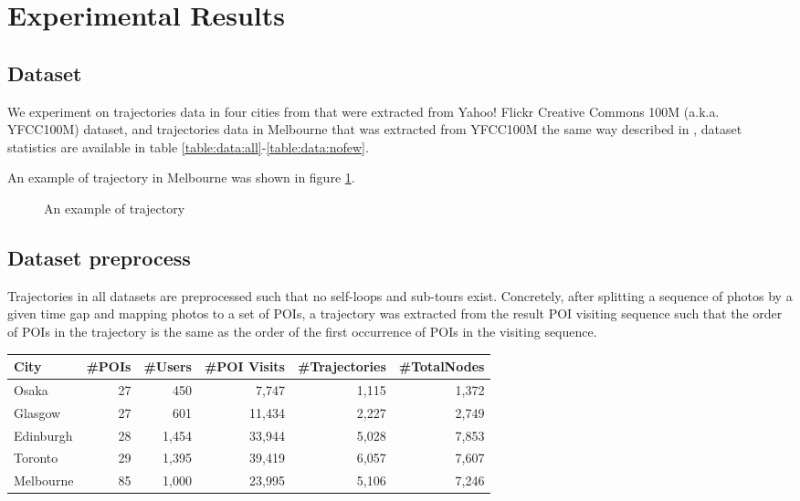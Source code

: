 \section{Experimental Results}
\label{experiment}

\subsection{Dataset}
\label{experiment:dataset}
We experiment on trajectories data in four cities from \cite{ijcai15} that were
extracted from Yahoo! Flickr Creative Commons 100M (a.k.a. YFCC100M) dataset\cite{yfcc100m},
and trajectories data in Melbourne that was extracted from YFCC100M the same way described in \cite{ht10, ijcai15},
dataset statistics are available in table \ref{table:data:all}-\ref{table:data:nofew}.

An example of trajectory in Melbourne was shown in figure \ref{fig:traj}.

\begin{figure}
\centering
{}
\caption{An example of trajectory}
\label{fig:traj}
\end{figure}

\subsection{Dataset preprocess}
\label{experiment:datapreprocess}
Trajectories in all datasets are preprocessed such that no self-loops and sub-tours exist.
Concretely, after splitting a sequence of photos by a given time gap and mapping photos to a set of POIs\cite{ht10, ijcai15},
a trajectory was extracted from the result POI visiting sequence such that the order of POIs in the trajectory is the same as 
the order of the first occurrence of POIs in the visiting sequence.

\begin{table*}
\centering
\caption{Dataset of all trajectories without loops}
\label{table:data:all}
\begin{tabular}{lrrrrr} \hline
\textbf{City} & \textbf{\#POIs} & \textbf{\#Users} & \textbf{\#POI Visits} & \textbf{\#Trajectories} & \textbf{\#TotalNodes} \\ \hline
Osaka & 27 & 450 & 7,747 & 1,115 & 1,372 \\ 
Glasgow & 27 & 601 & 11,434 & 2,227 & 2,749 \\ 
Edinburgh & 28 & 1,454 & 33,944 & 5,028 & 7,853 \\ 
Toronto & 29 & 1,395 & 39,419 & 6,057 & 7,607 \\ 
Melbourne & 85 & 1,000 & 23,995 & 5,106 & 7,246 \\ 
\hline
\end{tabular}
\end{table*}

